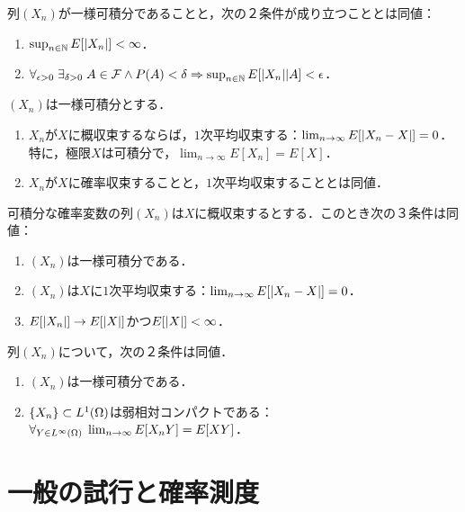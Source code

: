 \documentclass[uplatex,dvipdfmx]{jsreport}
\begin{document}
\begin{lemma}[一様可積分性の特徴付け]
    列$(X_n)$が一様可積分であることと，次の２条件が成り立つこととは同値：
    \begin{enumerate}
        \item $\sup_{n\in\mathbb{N}}E[\lvert X_n\rvert]<\infty$．
        \item $\forall_{\epsilon>0}\;\exists_{\delta>0}\;A\in\mathcal{F}\land P(A)<\delta\Rightarrow\sup_{n\in\mathbb{N}}E[\lvert X_n\rvert|A]<\epsilon$．
    \end{enumerate}
\end{lemma}

\begin{theorem}[一般化されたLebesgueの優収束定理]
    $(X_n)$は一様可積分とする．
    \begin{enumerate}
        \item $X_n$が$X$に概収束するならば，$1$次平均収束する：$\lim_{n\to\infty}E[\lvert X_n-X\rvert]=0$．
        特に，極限$X$は可積分で，$\lim_{n\to\infty}E[X_n]=E[X]$．
        \item $X_n$が$X$に確率収束することと，$1$次平均収束することとは同値．
    \end{enumerate}
\end{theorem}

\begin{corollary}
    可積分な確率変数の列$(X_n)$は$X$に概収束するとする．このとき次の３条件は同値：
    \begin{enumerate}
        \item $(X_n)$は一様可積分である．
        \item $(X_n)$は$X$に$1$次平均収束する：$\lim_{n\to\infty}E[\lvert X_n-X\rvert]=0$．
        \item $E[\lvert X_n\rvert]\to E[\lvert X\rvert]$かつ$E[\lvert X\rvert]<\infty$．
    \end{enumerate}
\end{corollary}

\begin{theorem}
    列$(X_n)$について，次の２条件は同値．
    \begin{enumerate}
        \item $(X_n)$は一様可積分である．
        \item $\{X_n\}\subset L^1(\Omega)$は弱相対コンパクトである：$\forall_{Y\in L^\infty(\Omega)}\;\lim_{n\to\infty}E[X_nY]=E[XY]$．
    \end{enumerate}
\end{theorem}

\section{一般の試行と確率測度}
\end{document}
